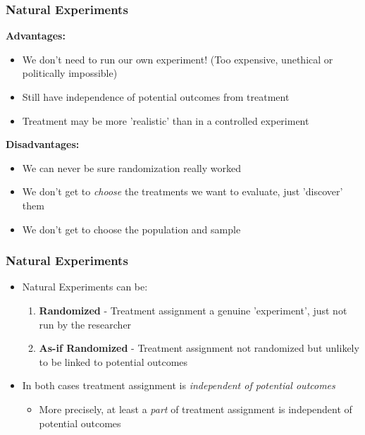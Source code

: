 \documentclass[xcolor=x11names,compress]{beamer}\usepackage[]{graphicx}\usepackage[]{color}
\renewcommand{\(}{\begin{columns}}
\renewcommand{\)}{\end{columns}}
\newcommand{\<}[1]{\begin{column}{#1}}
\renewcommand{\>}{\end{column}}
\begin{document}
\begin{frame}
\frametitle{Natural Experiments}
\begin{multicols}{2}
\textbf{Advantages:}
\begin{itemize}
\item We don't need to run our own experiment! (Too expensive, unethical or politically impossible)
\pause
\item Still have independence of potential outcomes from treatment
\pause
\item Treatment may be more 'realistic' than in a controlled experiment
\pause
\end{itemize}
\columnbreak
\textbf{Disadvantages:}
\begin{itemize}
\item We can never be sure randomization really worked
\pause
\item We don't get to \textit{choose} the treatments we want to evaluate, just 'discover' them
\pause
\item We don't get to choose the population and sample
\end{itemize}
\end{multicols}
\end{frame}

\begin{frame}
\frametitle{Natural Experiments}
\begin{itemize}
\item Natural Experiments can be:
\begin{enumerate}
\item \textbf{Randomized} - Treatment assignment a genuine 'experiment', just not run by the researcher
\item \textbf{As-if Randomized} - Treatment assignment not randomized but unlikely to be linked to potential outcomes
\end{enumerate}
\item In both cases treatment assignment is \textit{independent of potential outcomes}
\begin{itemize}
\item More precisely, at least a \textit{part} of treatment assignment is independent of potential outcomes
\end{itemize}
\end{itemize}
\end{frame}
\end{document}
